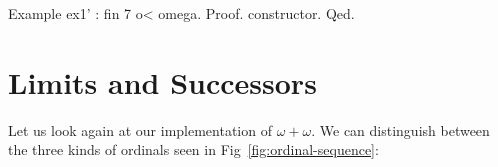 \begin{Coqsrc}
Example ex1' : fin 7 o< omega.
Proof. constructor. Qed.
\end{Coqsrc}





  




  




%

\section{Limits and Successors}

Let us look again at our implementation of $\omega+\omega$. We can distinguish between the three kinds of ordinals seen in Fig~\ref{fig:ordinal-sequence}:


